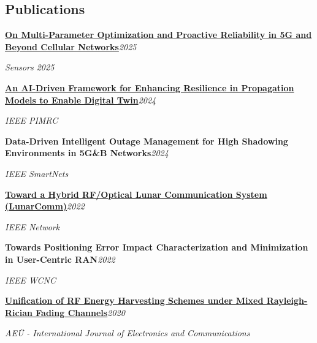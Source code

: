 \documentclass[9pt,letterpaper]{extarticle}
\newcommand{\entry}[2]{\Needspace{4\baselineskip}\textbf{#1}\hfill\textit{#2}\par}
\begin{document}
\subsection{Publications}
\entry{\href{https://doi.org/10.3390/s25247651}{On Multi-Parameter Optimization and Proactive Reliability in 5G and Beyond Cellular Networks}}{2025}
\textit{Sensors 2025}\par
\entry{\href{https://doi.org/10.1109/PIMRC59610.2024.10817403}{An AI-Driven Framework for Enhancing Resilience in Propagation Models to Enable Digital Twin}}{2024}
\textit{IEEE PIMRC}\par
\entry{Data-Driven Intelligent Outage Management for High Shadowing Environments in 5G\&B Networks}{2024}
\textit{IEEE SmartNets}\par
\entry{\href{https://arxiv.org/abs/2203.15899}{Toward a Hybrid RF/Optical Lunar Communication System (LunarComm)}}{2022}
\textit{IEEE Network}\par
\entry{Towards Positioning Error Impact Characterization and Minimization in User-Centric RAN}{2022}
\textit{IEEE WCNC}\par
\entry{\href{https://doi.org/10.1016/j.aeue.2020.153244}{Unification of RF Energy Harvesting Schemes under Mixed Rayleigh-Rician Fading Channels}}{2020}
\textit{AEÜ - International Journal of Electronics and Communications}\par
{}
\end{document}
